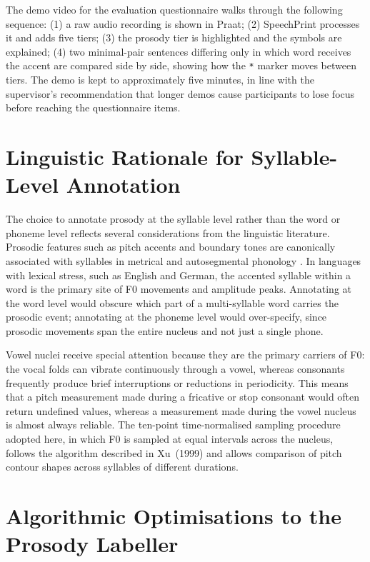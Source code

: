 The demo video for the evaluation questionnaire walks through the following
sequence: (1) a raw audio recording is shown in Praat; (2) SpeechPrint
processes it and adds five tiers; (3) the prosody tier is highlighted and the
symbols are explained; (4) two minimal-pair sentences differing only in which
word receives the accent are compared side by side, showing how the \texttt{*}
marker moves between tiers. The demo is kept to approximately five minutes, in
line with the supervisor's recommendation that longer demos cause participants
to lose focus before reaching the questionnaire items.

\section{Linguistic Rationale for Syllable-Level Annotation}
\label{sec:linguistic_rationale}

The choice to annotate prosody at the syllable level rather than the word or
phoneme level reflects several considerations from the linguistic literature.
Prosodic features such as pitch accents and boundary tones are canonically
associated with syllables in metrical and autosegmental phonology
\cite{ladd2008intonational, beckman2006tobi}. In languages with lexical stress,
such as English and German, the accented syllable within a word is the primary
site of F0 movements and amplitude peaks. Annotating at the word level would
obscure which part of a multi-syllable word carries the prosodic event; annotating
at the phoneme level would over-specify, since prosodic movements span the entire
nucleus and not just a single phone.

Vowel nuclei receive special attention because they are the primary carriers of
F0: the vocal folds can vibrate continuously through a vowel, whereas consonants
frequently produce brief interruptions or reductions in periodicity. This means
that a pitch measurement made during a fricative or stop consonant would often
return undefined values, whereas a measurement made during the vowel nucleus is
almost always reliable. The ten-point time-normalised sampling procedure adopted
here, in which F0 is sampled at equal intervals across the nucleus, follows the
algorithm described in Xu~(1999) \cite{xu1999} and allows comparison of pitch
contour shapes across syllables of different durations.

\section{Algorithmic Optimisations to the Prosody Labeller}
\label{sec:optimisations}

